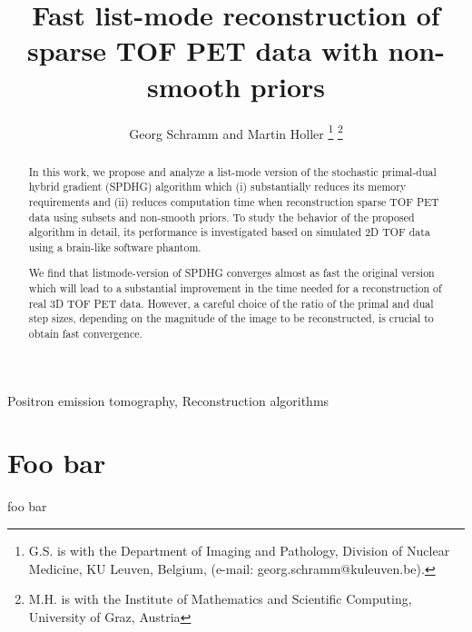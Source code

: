 \documentclass{IEEEtran}
\begin{document}
\title{Fast list-mode reconstruction of sparse TOF PET data with non-smooth priors} 
\author{Georg Schramm and Martin Holler
\thanks{G.S. is with the Department of Imaging and Pathology, Division of Nuclear Medicine,
KU Leuven, Belgium, (e-mail: georg.schramm@kuleuven.be).}
\thanks{M.H. is with the Institute of Mathematics and Scientific Computing, 
University of Graz, Austria}
}

\maketitle

\begin{abstract}
In this work, we propose and analyze a list-mode version of the stochastic primal-dual hybrid gradient
(SPDHG) algorithm which (i) substantially reduces its memory requirements and (ii) reduces
computation time when reconstruction sparse TOF PET data using subsets and non-smooth priors. 
To study the behavior of the proposed algorithm in detail, its performance 
is investigated based on simulated 2D TOF data using a brain-like software phantom.

We find that listmode-version of SPDHG converges almost as fast the original version
which will lead to a substantial improvement in the time needed for a reconstruction
of real 3D TOF PET data.
However, a careful choice of the ratio of the primal and dual step sizes, 
depending on the magnitude of the image to be reconstructed, is crucial to obtain fast convergence.
\end{abstract}

\begin{IEEEkeywords}
Positron emission tomography, Reconstruction algorithms
\end{IEEEkeywords}

\section{Foo bar}
foo bar
\end{document}
